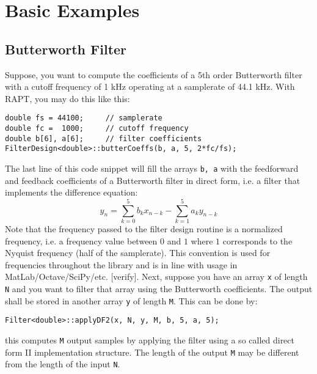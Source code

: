 \section{Basic Examples}

\subsection{Butterworth Filter}
Suppose, you want to compute the coefficients of a 5th order Butterworth filter with a cutoff frequency of 1 kHz operating at a samplerate of 44.1 kHz. With RAPT, you may do this like this:
\begin{lstlisting}
double fs = 44100;     // samplerate
double fc =  1000;     // cutoff frequency
double b[6], a[6];     // filter coefficients
FilterDesign<double>::butterCoeffs(b, a, 5, 2*fc/fs);
\end{lstlisting}
The last line of this code snippet will fill the arrays \texttt{b, a} with the feedforward and feedback coefficients of a Butterworth filter in direct form, i.e. a filter that implements the difference equation:
\begin{equation}
  \label{Eq:FilterDiffEq}
	y_n = \sum_{k=0}^5 b_k x_{n-k} - \sum_{k=1}^5 a_k y_{n-k}
\end{equation}
Note that the frequency passed to the filter design routine is a normalized frequency, i.e. a frequency value between $0$ and $1$ where $1$ corresponds to the Nyquist frequency (half of the samplerate). This convention is used for frequencies throughout the library and is in line with usage in MatLab/Octave/SciPy/etc. [verify]. Next, suppose you have an array \texttt{x} of length \texttt{N} and you want to filter that array using the Butterworth coefficients. The output shall be stored in another array \texttt{y} of length \texttt{M}. This can be done by:
\begin{lstlisting}
Filter<double>::applyDF2(x, N, y, M, b, 5, a, 5);
\end{lstlisting}
this computes \texttt{M} output samples by applying the filter using a so called direct form II implementation structure. The length of the output \texttt{M} may be different from the length of the input \texttt{N}.

